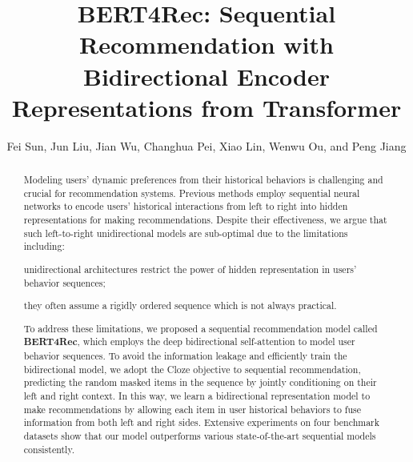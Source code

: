 \documentclass[sigconf]{acmart}
\begin{document}

\fancyhead{}

\title[BERT4Rec]{BERT4Rec: Sequential Recommendation with Bidirectional Encoder Representations from Transformer}



\author{Fei Sun, Jun Liu, Jian Wu, Changhua Pei, Xiao Lin, Wenwu Ou, and Peng Jiang}




\begin{abstract}

Modeling users' dynamic preferences from their historical behaviors is challenging and crucial for recommendation systems. 
Previous methods employ sequential neural networks to encode users' historical interactions from left to right into hidden representations for making recommendations.
Despite their effectiveness, we argue that such left-to-right unidirectional models are sub-optimal due to the limitations including:
\begin {enumerate*}[label=\bfseries\itshape\alph*\upshape)]
\item unidirectional architectures restrict the power of hidden representation in users' behavior sequences;
\item they often assume a rigidly ordered sequence which is not always practical.
\end {enumerate*}
To address these limitations, we proposed a sequential recommendation model called \textbf{BERT4Rec}, which employs the deep bidirectional self-attention to model user behavior sequences.
To avoid the information leakage and efficiently train the bidirectional model, we adopt the Cloze objective to sequential recommendation, predicting the random masked items in the sequence by jointly conditioning on their left and right context.
In this way, we learn a bidirectional representation model to make recommendations by allowing each item in user historical behaviors to fuse information from both left and right sides.
Extensive experiments on four benchmark datasets show that our model outperforms various state-of-the-art sequential models consistently.


\end{abstract}
\end{document}
